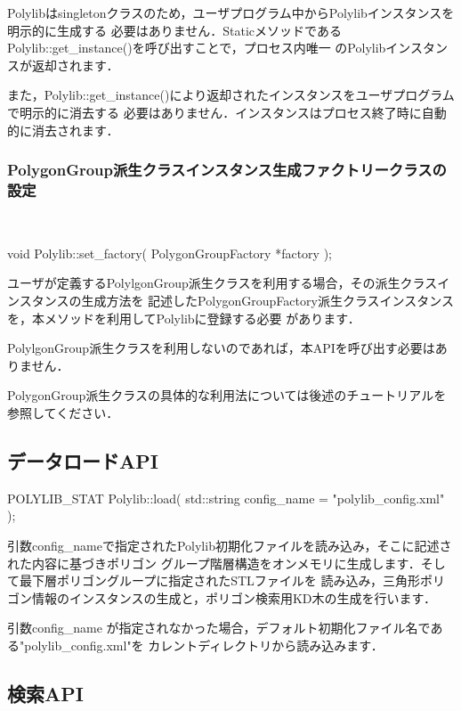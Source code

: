 {Polylibはsingletonクラスのため，ユーザプログラム中からPolylibインスタンスを明示的に生成する
必要はありません．StaticメソッドであるPolylib::get\_instance()を呼び出すことで，プロセス内唯一
のPolylibインスタンスが返却されます．

また，Polylib::get\_instance()により返却されたインスタンスをユーザプログラムで明示的に消去する
必要はありません．インスタンスはプロセス終了時に自動的に消去されます．

%
\subsubsection{PolygonGroup派生クラスインスタンス生成ファクトリークラスの設定}
　\\

\begin{program}
	void Polylib::set_factory(
		PolygonGroupFactory *factory
	);
\end{program}

ユーザが定義するPolylgonGroup派生クラスを利用する場合，その派生クラスインスタンスの生成方法を
記述したPolygonGroupFactory派生クラスインスタンスを，本メソッドを利用してPolylibに登録する必要
があります．

PolylgonGroup派生クラスを利用しないのであれば，本APIを呼び出す必要はありません．

PolygonGroup派生クラスの具体的な利用法については後述のチュートリアルを参照してください．

%
\subsection{データロードAPI}

\begin{program}
	POLYLIB_STAT Polylib::load(
		std::string config_name = "polylib_config.xml"
	);
\end{program}

引数config\_nameで指定されたPolylib初期化ファイルを読み込み，そこに記述された内容に基づきポリゴン
グループ階層構造をオンメモリに生成します．そして最下層ポリゴングループに指定されたSTLファイルを
読み込み，三角形ポリゴン情報のインスタンスの生成と，ポリゴン検索用KD木の生成を行います．

引数config\_name が指定されなかった場合，デフォルト初期化ファイル名である"polylib\_config.xml"を
カレントディレクトリから読み込みます．

%
\subsection{検索API} \label{search_api}

}
